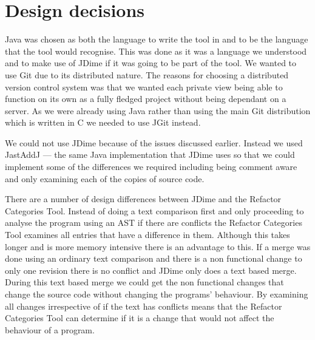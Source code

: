
\section{Design decisions}
Java was chosen as both the language to write the tool in and to be the language that the tool would recognise.  This was done as it was a language we understood and to make use of JDime if it was going to be part of the tool.  
We wanted to use Git due to its distributed nature.  
The reasons for choosing a distributed version control system was that we wanted each private view being able to function on its own as a fully fledged project without being dependant on a server.  As we were already using Java rather than using the main Git distribution which is written in C we needed to use JGit instead.

We could not use JDime because of the issues discussed earlier. Instead we used JastAddJ --- the same Java implementation that JDime uses so that we could implement some of the differences we required including being comment aware and only examining each of the copies of source code.

There are a number of design differences between JDime and the Refactor Categories Tool.
 Instead of doing a text comparison first and only proceeding to analyse the program using an AST if there are conflicts the Refactor Categories Tool examines all entries that have a difference in them.
Although this takes longer and is more memory intensive there is an advantage to this.  
If a merge was done using an ordinary text comparison and there is a non functional change to only one revision there is no conflict and JDime only does a text based merge.  
During this text based merge we could get the non functional changes that change the source code without changing the programs' behaviour. By examining all changes irrespective of if the text has conflicts means that the Refactor Categories Tool can determine if it is a change that would not affect the behaviour of a program.

